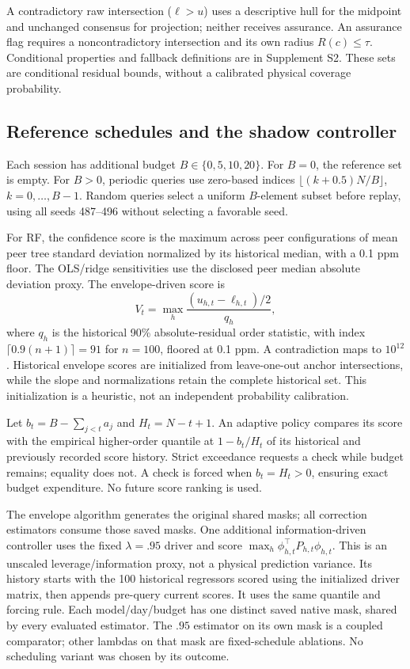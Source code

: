 A contradictory raw intersection ($\ell>u$) uses a descriptive hull for the midpoint and unchanged consensus for projection; neither receives assurance. An assurance flag requires a noncontradictory intersection and its own radius $R(c)\leq\tau$. Conditional properties and fallback definitions are in Supplement S2. These sets are conditional residual bounds, without a calibrated physical coverage probability.

\subsection{Reference schedules and the shadow controller}\label{sec:schedules}
Each session has additional budget $B\in\{0,5,10,20\}$. For $B=0$, the reference set is empty. For $B>0$, periodic queries use zero-based indices $\lfloor(k+0.5)N/B\rfloor$, $k=0,\ldots,B-1$. Random queries select a uniform $B$-element subset before replay, using all seeds 487--496 without selecting a favorable seed.

For RF, the confidence score is the maximum across peer configurations of mean peer tree standard deviation normalized by its historical median, with a 0.1 ppm floor. The OLS/ridge sensitivities use the disclosed peer median absolute deviation proxy. The envelope-driven score is
\begin{equation}
V_t=\max_h\frac{(u_{h,t}-\ell_{h,t})/2}{q_h},
\label{eq:score}
\end{equation}
where $q_h$ is the historical 90\% absolute-residual order statistic, with index $\lceil0.9(n+1)\rceil=91$ for $n=100$, floored at 0.1 ppm. A contradiction maps to $10^{12}$. Historical envelope scores are initialized from leave-one-out anchor intersections, while the slope and normalizations retain the complete historical set. This initialization is a heuristic, not an independent probability calibration.

Let $b_t=B-\sum_{j<t}a_j$ and $H_t=N-t+1$. An adaptive policy compares its score with the empirical higher-order quantile at $1-b_t/H_t$ of its historical and previously recorded score history. Strict exceedance requests a check while budget remains; equality does not. A check is forced when $b_t=H_t>0$, ensuring exact budget expenditure. No future score ranking is used.

The envelope algorithm generates the original shared masks; all correction estimators consume those saved masks. One additional information-driven controller uses the fixed $\lambda=.95$ driver and score $\max_h\phi_{h,t}^\top P_{h,t}\phi_{h,t}$. This is an unscaled leverage/information proxy, not a physical prediction variance. Its history starts with the 100 historical regressors scored using the initialized driver matrix, then appends pre-query current scores. It uses the same quantile and forcing rule. Each model/day/budget has one distinct saved native mask, shared by every evaluated estimator. The $.95$ estimator on its own mask is a coupled comparator; other lambdas on that mask are fixed-schedule ablations. No scheduling variant was chosen by its outcome.

